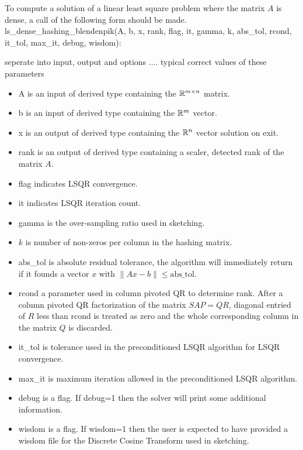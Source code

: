 \documentclass[english,11pt]{article}
\begin{document}
To compute a solution of a linear least square problem where the matrix $A$ is dense, a call of the following form should be made. \\

ls_dense_hashing_blendenpik(A, b, x, rank, flag, it, gamma, k, abs_tol, rcond, it_tol, max_it, debug, wisdom):

\color{red} seperate into input, output and options .... typical correct values of these parameters \color{black}
\begin{itemize}
	\setlength\itemsep{-0.5em}
	\item A is an input of derived type containing the $\mathbb{R}^{m\times n}$ matrix.

	\item b is an input of derived type containing the $\mathbb{R}^m$ vector.

	\item x is an output of derived type containing the $\mathbb{R}^n$ vector solution on exit. 

	\item rank is an output of derived type containing a scaler, detected rank of the matrix $A$. 

	\item flag indicates LSQR convergence. 

	\item it indicates LSQR iteration count. 

	\item gamma is the over-sampling ratio used in sketching. 

	\item $k$ is number of non-zeros per column in the hashing matrix. 

	\item abs_tol is absolute residual tolerance, the algorithm will immediately return if it founds a vector $x$ with $\|Ax-b\| \leq \text{abs_tol}$.

	\item rcond a parameter used in column pivoted QR to determine rank. After a column pivoted QR factorization of the matrix $SAP =QR$, diagonal entried of $R$ less than rcond is treated as zero and the whole corresponding column in the matrix $Q$ is discarded. 

	\item it_tol is tolerance used in the preconditioned LSQR algorithm for LSQR convergence.

	\item max_it is maximum iteration allowed in the preconditioned LSQR algorithm. 

	\item debug is a flag. If debug=1 then the solver will print some additional information.

	\item wisdom is a flag. If wisdom=1 then the user is expected to have provided a wisdom file for the Discrete Cosine Transform used in sketching. 
\end{itemize}
\end{document}
